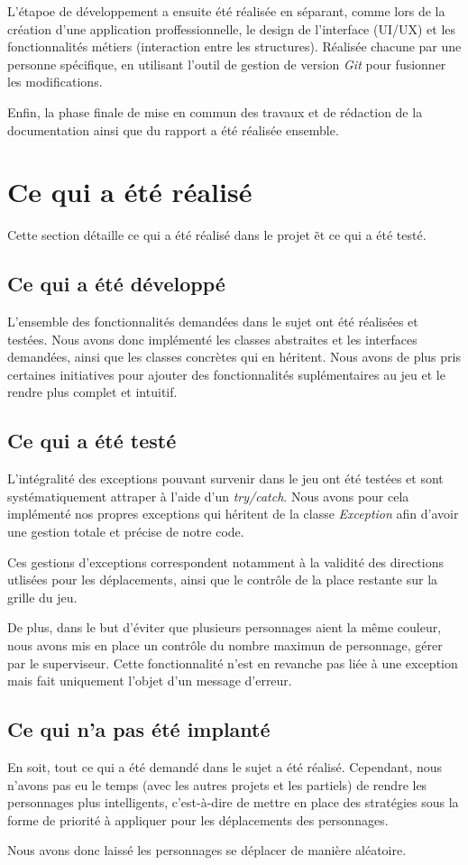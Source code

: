 L'étapoe de développement a ensuite été réalisée en séparant, comme lors de la création d'une application proffessionnelle, le design de l'interface (UI/UX) et les fonctionnalités métiers (interaction entre les structures).
Réalisée chacune par une personne spécifique, en utilisant l'outil de gestion de version \emph{Git} pour fusionner les modifications.

Enfin, la phase finale de mise en commun des travaux et de rédaction de la documentation ainsi que du rapport a été réalisée ensemble.

\section{Ce qui a été réalisé}

Cette section détaille ce qui a été réalisé dans le projet \nom\~et ce qui a été testé.

\subsection{Ce qui a été développé}

L'ensemble des fonctionnalités demandées dans le sujet ont été réalisées et testées.
Nous avons donc implémenté les classes abstraites et les interfaces demandées, ainsi que les classes concrètes qui en héritent.
Nous avons de plus pris certaines initiatives pour ajouter des fonctionnalités suplémentaires au jeu et le rendre plus complet et intuitif.


\subsection{Ce qui a été testé}

L'intégralité des exceptions pouvant survenir dans le jeu ont été testées et sont systématiquement attraper à l'aide d'un \emph{try/catch}. Nous avons pour cela implémenté nos propres exceptions qui héritent de la classe \emph{Exception} afin d'avoir une gestion totale et précise de notre code.

Ces gestions d'exceptions correspondent notamment à la validité des directions utlisées pour les déplacements, ainsi que le contrôle de la place restante sur la grille du jeu.

De plus, dans le but d'éviter que plusieurs personnages aient la même couleur, nous avons mis en place un contrôle du nombre maximun de personnage, gérer par le superviseur. 
Cette fonctionnalité n'est en revanche pas liée à une exception mais fait uniquement l'objet d'un message d'erreur.

\subsection{Ce qui n'a pas été implanté}

En soit, tout ce qui a été demandé dans le sujet a été réalisé. Cependant, nous n'avons pas eu le temps (avec les autres projets et les partiels) de rendre les personnages plus intelligents, c'est-à-dire de mettre en place des stratégies sous la forme de priorité à appliquer pour les déplacements des personnages. 

Nous avons donc laissé les personnages se déplacer de manière aléatoire.